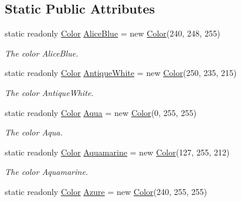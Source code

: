 \subsection*{Static Public Attributes}
\begin{DoxyCompactItemize}
\item 
static readonly \hyperlink{struct_tri_devs_1_1_tri_engine2_d_1_1_color}{Color} \hyperlink{struct_tri_devs_1_1_tri_engine2_d_1_1_color_a9b4d45690414a616d32de81bcc58d40e}{Alice\-Blue} = new \hyperlink{struct_tri_devs_1_1_tri_engine2_d_1_1_color}{Color}(240, 248, 255)
\begin{DoxyCompactList}\small\item\em The color Alice\-Blue. \end{DoxyCompactList}\item 
static readonly \hyperlink{struct_tri_devs_1_1_tri_engine2_d_1_1_color}{Color} \hyperlink{struct_tri_devs_1_1_tri_engine2_d_1_1_color_a980b4b8d86eff9b3ea3617684998bfad}{Antique\-White} = new \hyperlink{struct_tri_devs_1_1_tri_engine2_d_1_1_color}{Color}(250, 235, 215)
\begin{DoxyCompactList}\small\item\em The color Antique\-White. \end{DoxyCompactList}\item 
static readonly \hyperlink{struct_tri_devs_1_1_tri_engine2_d_1_1_color}{Color} \hyperlink{struct_tri_devs_1_1_tri_engine2_d_1_1_color_a60476dad6dcdbde416c8b5061582563f}{Aqua} = new \hyperlink{struct_tri_devs_1_1_tri_engine2_d_1_1_color}{Color}(0, 255, 255)
\begin{DoxyCompactList}\small\item\em The color Aqua. \end{DoxyCompactList}\item 
static readonly \hyperlink{struct_tri_devs_1_1_tri_engine2_d_1_1_color}{Color} \hyperlink{struct_tri_devs_1_1_tri_engine2_d_1_1_color_a8bf584eadbc06e467b7738583178487a}{Aquamarine} = new \hyperlink{struct_tri_devs_1_1_tri_engine2_d_1_1_color}{Color}(127, 255, 212)
\begin{DoxyCompactList}\small\item\em The color Aquamarine. \end{DoxyCompactList}\item 
static readonly \hyperlink{struct_tri_devs_1_1_tri_engine2_d_1_1_color}{Color} \hyperlink{struct_tri_devs_1_1_tri_engine2_d_1_1_color_ab567e615caa69a803617e019f2710e14}{Azure} = new \hyperlink{struct_tri_devs_1_1_tri_engine2_d_1_1_color}{Color}(240, 255, 255)

\end{DoxyCompactItemize}
